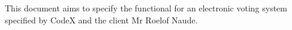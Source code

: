 This document aims to specify the functional for an electronic voting system specified by CodeX and the client Mr Roelof Naude.